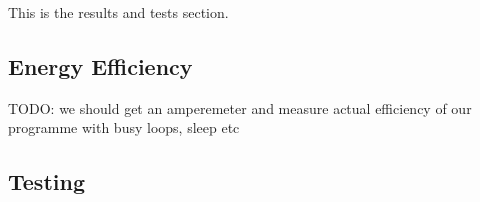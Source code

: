 
This is the results and tests section.

\subsection{Energy Efficiency}

TODO: we should get an amperemeter and measure actual efficiency of our programme with busy loops, sleep etc

\subsection{Testing}
